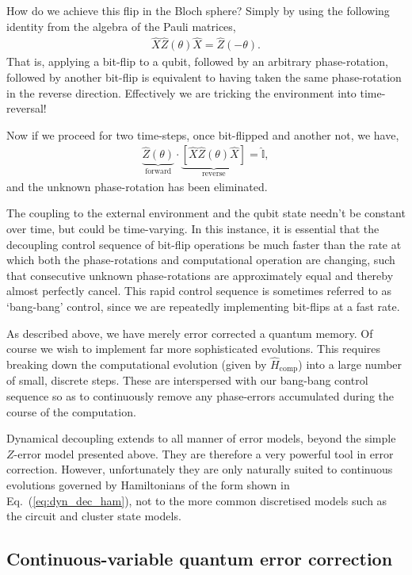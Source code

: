 How do we achieve this flip in the Bloch sphere? Simply by using the following identity from the algebra of the Pauli matrices,
\begin{align}
\hat{X}\hat{Z}(\theta)\hat{X} = 	\hat{Z}(-\theta).
\end{align}
That is, applying a bit-flip to a qubit, followed by an arbitrary phase-rotation, followed by another bit-flip is equivalent to having taken the same phase-rotation in the reverse direction. Effectively we are tricking the environment into time-reversal!

Now if we proceed for two time-steps, once bit-flipped and another not, we have,
\begin{align}
\underbrace{\hat{Z}(\theta)}_{\mathrm{forward}}\cdot\underbrace{[\hat{X}\hat{Z}(\theta)\hat{X}]}_{\mathrm{reverse}} = \hat{\mathbb{I}},
\end{align}
and the unknown phase-rotation has been eliminated.

The coupling to the external environment and the qubit state needn't be constant over time, but could be time-varying. In this instance, it is essential that the decoupling control sequence of bit-flip operations be much faster than the rate at which both the phase-rotations and computational operation are changing, such that consecutive unknown phase-rotations are approximately equal and thereby almost perfectly cancel. This rapid control sequence is sometimes referred to as `bang-bang' control, since we are repeatedly implementing bit-flips at a fast rate. 

As described above, we have merely error corrected a quantum memory. Of course we wish to implement far more sophisticated evolutions. This requires breaking down the computational evolution (given by $\hat{H}_\mathrm{comp}$) into a large number of small, discrete steps. These are interspersed with our bang-bang control sequence so as to continuously remove any phase-errors accumulated during the course of the computation.

Dynamical decoupling extends to all manner of error models, beyond the simple $Z$-error model presented above. They are therefore a very powerful tool in error correction. However, unfortunately they are only naturally suited to continuous evolutions governed by Hamiltonians of the form shown in Eq.~(\ref{eq:dyn_dec_ham}), not to the more common discretised models such as the circuit and cluster state models.


%
%

\subsection{Continuous-variable quantum error correction}

